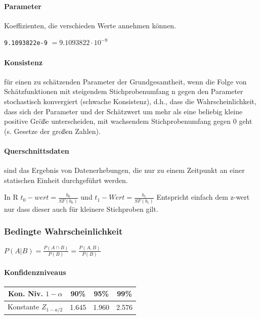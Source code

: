 \documentclass[a3paper, 8pt]{extarticle}
\begin{document}
\begin{multicols*}{5}
\paragraph{Parameter} Koeffizienten, die verschieden Werte annehmen können.

\texttt{9.1093822e-9} $= 9.1093822\cdot 10^{-9}$


\paragraph{Konsistenz} für einen zu schätzenden Parameter der Grundgesamtheit, wenn die Folge von Schätzfunktionen mit steigendem Stichprobenumfang n gegen den Parameter stochastisch konvergiert (schwache Konsistenz), d.h., dass die Wahrscheinlichkeit, dass sich der Parameter und der Schätzwert um mehr als eine beliebig kleine positive Größe unterscheiden, mit wachsendem Stichprobenumfang gegen 0 geht (s. Gesetze der großen Zahlen).

\paragraph{Querschnittsdaten} sind das Ergebnis von Datenerhebungen, die nur zu einem Zeitpunkt an einer statischen Einheit durchgeführt werden.

In R $t_0-wert=\frac{b_0}{SF(b_0)}$ und $t_1-Wert=\frac{b_1}{SF(b_1)}$ Entspricht einfach dem z-wert nur dass dieser auch für kleinere Stichproben gilt.
\subsubsection{Bedingte Wahrscheinlichkeit}
$P(A|B)=\frac{P(A\cap B)}{P(B)}=\frac{P(A, B)}{P(B)}$


\paragraph{Konfidenzniveaus}

\begin{center}
\begin{tabular}{ c | c | c | c}
 Kon. Niv. $1-\alpha$ & 90\% & 95\% & 99\% \\ \hline 
 Konstante $Z_{1-a/2}$ & 1.645 & 1.960 & 2.576
\end{tabular}
\end{center}


\end{multicols*}
\end{document}
